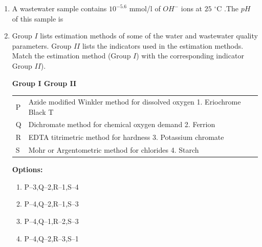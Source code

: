 \documentclass[journal]{IEEEtran}
\begin{document}
\begin{enumerate}
\begin{enumerate}
\end{enumerate}

\item A wastewater sample contains $10^{-5.6}$ mmol/l of $OH^{-}$ ions at $25$ $^\circ\text{C}$ .The $pH$ of this sample is \hfill {}

\begin{enumerate}
\end{enumerate}

\item Group $I$ lists estimation methods of some of the water and wastewater quality parameters. Group $II$ lists the indicators used in the estimation methods. Match the estimation method (Group $I$) with the corresponding indicator Group $II$). \hfill {}

\vspace{1cm}
\textbf{Group I \hfill Group II}

\begin{tabular}{ll}
P & Azide modified Winkler method for dissolved oxygen \hfill 1. Eriochrome Black T \\
Q & Dichromate method for chemical oxygen demand \hfill 2. Ferrion \\
R & EDTA titrimetric method for hardness \hfill 3. Potassium chromate \\
S & Mohr or Argentometric method for chlorides \hfill 4. Starch \\
\end{tabular}

\vspace{0.5cm}

\textbf{Options:}
\begin{enumerate}
  \item P--3,\quad Q--2,\quad R--1,\quad S--4
  \item P--4,\quad Q--2,\quad R--1,\quad S--3
  \item P--4,\quad Q--1,\quad R--2,\quad S--3
  \item P--4,\quad Q--2,\quad R--3,\quad S--1
\end{enumerate}



\end{enumerate}
\end{document}
